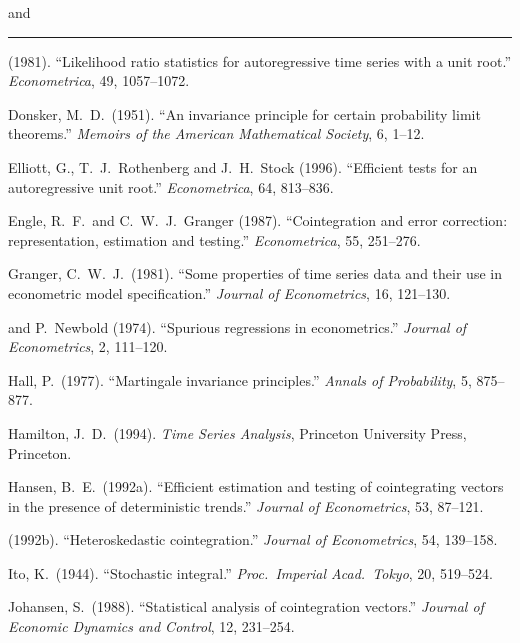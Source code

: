 \begin{description}
\item[] \hspace{2em} and \rule{2em}{0.4pt} (1981). ``Likelihood ratio statistics for autoregressive time series with a unit root.'' \emph{Econometrica}, 49, 1057--1072.

\item Donsker, M.\ D.\ (1951). ``An invariance principle for certain probability limit theorems.'' \emph{Memoirs of the American Mathematical Society}, 6, 1--12.

\item Elliott, G., T.\ J.\ Rothenberg and J.\ H.\ Stock (1996). ``Efficient tests for an autoregressive unit root.'' \emph{Econometrica}, 64, 813--836.

\item Engle, R.\ F.\ and C.\ W.\ J.\ Granger (1987). ``Cointegration and error correction: representation, estimation and testing.'' \emph{Econometrica}, 55, 251--276.

\item Granger, C.\ W.\ J.\ (1981). ``Some properties of time series data and their use in econometric model specification.'' \emph{Journal of Econometrics}, 16, 121--130.

\item[] \hspace{2em} and P.\ Newbold (1974). ``Spurious regressions in econometrics.'' \emph{Journal of Econometrics}, 2, 111--120.

\item Hall, P.\ (1977). ``Martingale invariance principles.'' \emph{Annals of Probability}, 5, 875--877.

\item Hamilton, J.\ D.\ (1994). \emph{Time Series Analysis}, Princeton University Press, Princeton.

\item Hansen, B.\ E.\ (1992a). ``Efficient estimation and testing of cointegrating vectors in the presence of deterministic trends.'' \emph{Journal of Econometrics}, 53, 87--121.

\item[] \hspace{2em} (1992b). ``Heteroskedastic cointegration.'' \emph{Journal of Econometrics}, 54, 139--158.

\item Ito, K.\ (1944). ``Stochastic integral.'' \emph{Proc.\ Imperial Acad.\ Tokyo}, 20, 519--524.

\item Johansen, S.\ (1988). ``Statistical analysis of cointegration vectors.'' \emph{Journal of Economic Dynamics and Control}, 12, 231--254.


\end{description}
